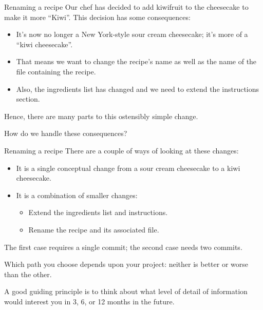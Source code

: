 \documentclass{git_course}
\begin{document}
\begin{frame}[fragile]{Renaming a recipe}
    Our chef has decided to add kiwifruit to the cheesecake to make it more
    ``Kiwi''.  This decision has some consequences:
    \begin{itemize}
        \item It's now no longer a New York-style sour cream cheesecake;
            it's more of a ``kiwi cheesecake''.
        \item That means we want to change the recipe's name as well as the
            name of the file containing the recipe.
        \item Also, the ingredients list has changed and we need to extend
            the instructions section.
    \end{itemize}

    Hence, there are many parts to this ostensibly simple change.

    How do we handle these consequences?
\end{frame}

\begin{frame}[fragile]{Renaming a recipe}
    There are a couple of ways of looking at these changes:
    \begin{itemize}
        \item It is a single conceptual change from a sour cream
            cheesecake to a kiwi cheesecake.
        \item It is a combination of smaller changes:
            \begin{itemize}
                \item Extend the ingredients list and instructions.
                \item Rename the recipe and its associated file.
            \end{itemize}
    \end{itemize}

    The first case requires a single commit;  the second case needs two
    commits.

    Which path you choose depends upon your project: neither is better or
    worse than the other.

    A good guiding principle is to think about what level of detail of
    information would interest you in 3, 6, or 12 months in the future.
\end{frame}
\end{document}
